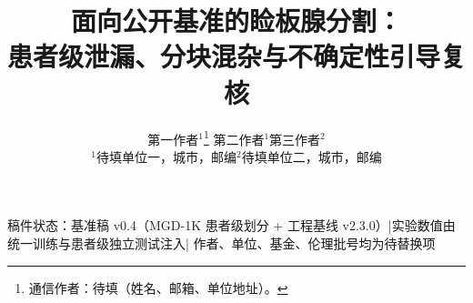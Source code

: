 \documentclass[11pt,a4paper,fontset=windows]{ctexart}
\title{\bfseries 面向公开基准的睑板腺分割：\\[2pt]
患者级泄漏、分块混杂与不确定性引导复核}
\author{第一作者$^{1}$\thanks{通信作者：待填（姓名、邮箱、单位地址）。}\quad
第二作者$^{1}$\quad 第三作者$^{2}$\\[4pt]
{\small $^{1}$待填单位一，城市，邮编\quad $^{2}$待填单位二，城市，邮编}}
\date{}
\begin{document}
\maketitle

\begin{center}
\footnotesize\color{gray}
稿件状态：基准稿 v0.4（MGD-1K 患者级划分 + 工程基线 v2.3.0）\quad|\quad 实验数值由统一训练与患者级独立测试注入\quad|\quad
作者、单位、基金、伦理批号均为待替换项
\end{center}

\vspace{-0.6em}

\tableofcontents
\newpage















\appendix

\end{document}
